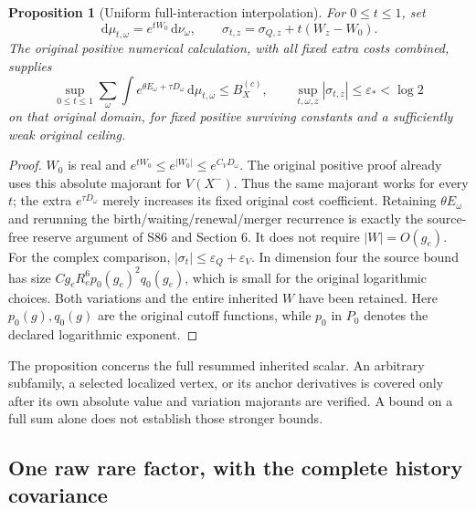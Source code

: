 \documentclass[11pt,letterpaper]{article}
\numberwithin{equation}{section}
\theoremstyle{plain}
\newtheorem{proposition}[theorem]{Proposition}
\theoremstyle{remark}\newtheorem{remark}[theorem]{Scope}
\newcommand{\dd}{\,\mathrm d}\newcommand{\eps}{\varepsilon}
\begin{document}
\begin{proposition}[Uniform full-interaction interpolation]
For $0\le t\le1$, set
\begin{equation}
 \dd\mu_{t,\omega}=e^{tW_0}\dd\nu_\omega,\qquad
 \sigma_{t,z}=\sigma_{Q,z}+t(W_z-W_0).
 \label{eq:interpolation}
\end{equation}
The original positive numerical calculation, with all fixed extra costs
combined, supplies
\begin{equation}
 \sup_{0\le t\le1}\sum_\omega\int
 e^{\theta E_\omega+\tau D_\omega}\dd\mu_{t,\omega}
 \le B_X^{(c)},\qquad
 \sup_{t,\omega,z}|\sigma_{t,z}|\le\eps_*<\log2
 \label{eq:uniformv}
\end{equation}
on that original domain, for fixed positive surviving constants and a
sufficiently weak original ceiling.
\end{proposition}
\begin{proof}
$W_0$ is real and
$e^{tW_0}\le e^{|W_0|}\le e^{C_VD_\omega}$.
The original positive proof already uses this absolute majorant for
$V(X^-)$. Thus the same majorant works for every $t$; the extra
$e^{\tau D_\omega}$ merely increases its fixed original cost coefficient.
Retaining $\theta E_\omega$ and rerunning the birth/waiting/renewal/merger
recurrence is exactly the source-free reserve argument of S86 and
Section 6. It does not require $|W|=O(g_e)$.
For the complex comparison,
$|\sigma_t|\le\eps_Q+\eps_V$. In dimension four the source bound
has size $C g_eR_e^6p_0(g_e)^2q_0(g_e)$, which is small for the original
logarithmic choices. Both variations and the entire inherited $W$ have
been retained. Here $p_0(g),q_0(g)$ are the original cutoff functions,
while $p_0$ in $P_0$ denotes the declared logarithmic exponent.
\end{proof}

The proposition concerns the full resummed inherited scalar. An arbitrary
subfamily, a selected localized vertex, or its anchor derivatives is
covered only after its own absolute value and variation majorants are
verified. A bound on a full sum alone does not establish those stronger
bounds.

\subsection{One raw rare factor, with the complete history covariance}
\end{document}
